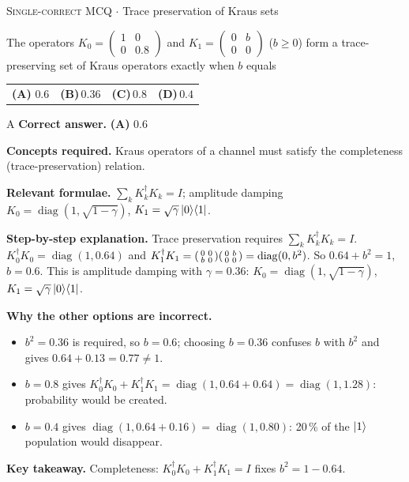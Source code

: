 \documentclass[11pt,a4paper]{article}
\newcommand{\optlabel}[1]{\textbf{(#1)}}
\newcommand{\correctlabel}[1]{\textcolor{okgreen}{\textbf{(#1)}\,\ding{51}}}
\newenvironment{qitem}[1]{\begin{list}{}{\setlength{\leftmargin}{3.3em}\setlength{\labelwidth}{3.1em}%
  \setlength{\labelsep}{0.2em}\setlength{\topsep}{3pt}\setlength{\parsep}{3pt}}\item[\textbf{Q.#1}\hfill]}{\end{list}}
\newcommand{\qsep}{\par\vspace{2pt}{\color{black!15}\hrule}\vspace{4pt}}
\newcommand{\qmeta}[2]{{\footnotesize\color{black!60}\textsc{#1} \;$\cdot$\; #2}\par}
\begin{document}
\begin{qitem}{5}
\qmeta{Single-correct MCQ}{Trace preservation of Kraus sets}
The operators $K_0 = \begin{pmatrix}1 & 0\\ 0 & 0.8\end{pmatrix}$ and $K_1 = \begin{pmatrix}0 & b\\ 0 & 0\end{pmatrix}$ ($b \ge 0$) form a
trace-preserving set of Kraus operators exactly when $b$ equals
\par\smallskip\noindent\begin{tabularx}{\linewidth}{@{}*{4}{L}@{}}
\correctlabel{A}\,$0.6$ & \optlabel{B}\,$0.36$ & \optlabel{C}\,$0.8$ & \optlabel{D}\,$0.4$
\end{tabularx}
\end{qitem}
\begin{solbox}{A}
\textbf{\color{brand}Correct answer.} \textcolor{okgreen}{\textbf{(A)}} $0.6$

\textbf{\color{brand}Concepts required.} Kraus operators of a channel must satisfy the completeness (trace-preservation) relation.

\textbf{\color{brand}Relevant formulae.} $\sum_kK_k^\dagger K_k = I$; amplitude damping $K_0 = \operatorname{diag}(1, \sqrt{1-\gamma})$, $K_1 = \sqrt\gamma\ket0\!\bra1$.

\textbf{\color{brand}Step-by-step explanation.} Trace preservation requires $\sum_kK_k^\dagger K_k = I$. $K_0^\dagger K_0 = \operatorname{diag}(1, 0.64)$ and
$K_1^\dagger K_1 = \begin{psmallmatrix}0&0\\b&0\end{psmallmatrix}\begin{psmallmatrix}0&b\\0&0\end{psmallmatrix} = \operatorname{diag}(0, b^2)$.
So $0.64 + b^2 = 1$, $b = 0.6$. This is amplitude damping with $\gamma = 0.36$: $K_0 = \operatorname{diag}(1, \sqrt{1-\gamma})$, $K_1 = \sqrt\gamma\ket0\!\bra1$.

\textbf{\color{brand}Why the other options are incorrect.}
\begin{itemize}[leftmargin=2.4em, itemsep=1pt, topsep=2pt]
\item[\textbf{(B)}] $b^2 = 0.36$ is required, so $b = 0.6$; choosing $b = 0.36$ confuses $b$ with $b^2$ and gives $0.64 + 0.13 = 0.77 \neq 1$.
\item[\textbf{(C)}] $b = 0.8$ gives $K_0^\dagger K_0 + K_1^\dagger K_1 = \operatorname{diag}(1, 0.64 + 0.64) = \operatorname{diag}(1, 1.28)$: probability would be created.
\item[\textbf{(D)}] $b = 0.4$ gives $\operatorname{diag}(1, 0.64 + 0.16) = \operatorname{diag}(1, 0.80)$: 20\,\% of the $\ket1$ population would disappear.
\end{itemize}
\textbf{\color{brand}Key takeaway.} Completeness: $K_0^\dagger K_0 + K_1^\dagger K_1 = I$ fixes $b^2 = 1 - 0.64$.
\end{solbox}
\qsep
\end{document}
